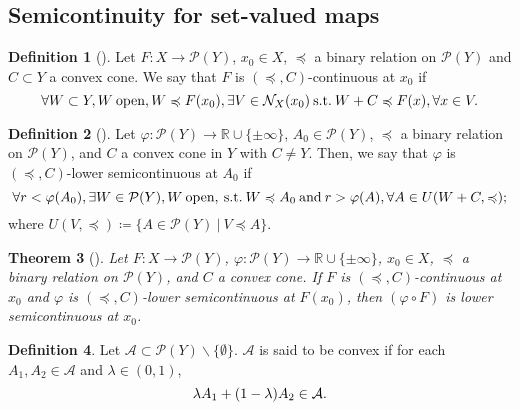 \documentclass[a4paper,11pt]{jsarticle}
\newtheorem{thm}{Theorem}[section]
\theoremstyle{definition}
\newtheorem{dfn}[thm]{Definition}
\newcommand{\RealNumberSet}{\mathbb{R}}
\newcommand{\SuchThat}{\:\text{\rm s.t.}\:}
\newcommand{\SetForm}[2]{
  \{{#1}\:|\:{#2}\}
}
\begin{document}
\subsection{Semicontinuity for set-valued maps}

\begin{dfn}[\cite{DechboonTanaka2024}]
  Let $F \colon X \to \mathcal{P}(Y)$, $x_0 \in X$, $\preccurlyeq$ a binary relation on $\mathcal{P}(Y)$
  and $C \subset Y$ a convex cone. We say that $F$ is $(\preccurlyeq, C)$-continuous at $x_0$ if
  \begin{equation}
    \forall W \subset Y, W\:\text{open},W \preccurlyeq F(x_0), \exists V \in \mathcal{N}_{X}(x_0) \SuchThat W + C \preccurlyeq F(x), \forall x \in V. \notag
  \end{equation}
\end{dfn}

\begin{dfn}[\cite{DechboonTanaka2024}]
  Let $\varphi \colon \mathcal{P}(Y) \to \RealNumberSet \cup \{\pm \infty\}$, $A_0 \in \mathcal{P}(Y)$,
  $\preccurlyeq$ a binary relation on $\mathcal{P}(Y)$, and $C$ a convex cone in $Y$ with $C \ne Y$. Then,
  we say that $\varphi$ is $(\preccurlyeq, C)$-lower semicontinuous at $A_0$ if
  \begin{equation}
    \forall r < \varphi (A_0), \exists W \in \mathcal{P}(Y), W\:\text{open}, \SuchThat W \preccurlyeq A_0 \:\text{and}\:
    r > \varphi (A), \forall A \in U(W + C, \preccurlyeq); \notag
  \end{equation}
  where $U(V,\preccurlyeq) \coloneqq \SetForm{A \in \mathcal{P}(Y)}{V \preccurlyeq A}$.
\end{dfn}

\begin{thm}[\cite{DechboonTanaka2024}]
  Let $F \colon X \to \mathcal{P}(Y)$, $\varphi \colon \mathcal{P}(Y) \to \RealNumberSet \cup \{\pm \infty\}$, $x_0 \in X$,
  $\preccurlyeq$ a binary relation on $\mathcal{P}(Y)$, and $C$ a convex cone. If $F$ is $(\preccurlyeq, C)$-continuous at $x_0$
  and $\varphi$ is $(\preccurlyeq, C)$-lower semicontinuous at $F(x_0)$, then $(\varphi \circ F)$ is lower semicontinuous at $x_0$.
\end{thm}

\begin{dfn}
  Let $\mathcal{A} \subset \mathcal{P}(Y) \backslash \{\emptyset\}$. $\mathcal{A}$ is said to be convex if for each $A_1, A_2 \in \mathcal{A}$ and $\lambda \in (0,1)$,
  \begin{equation}
    \lambda A_1 + (1-\lambda) A_2 \in \mathcal{A}. \notag
  \end{equation}
\end{dfn}
\end{document}
